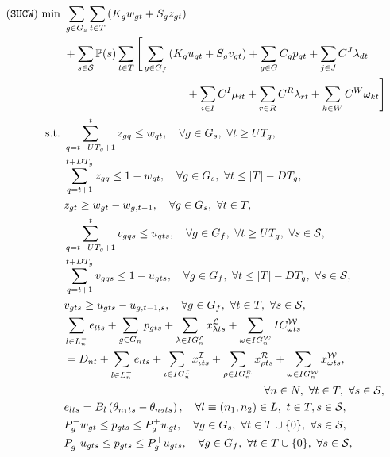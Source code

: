 \begin{subequations} \label{sucw:formulation}
	\begin{align}
	(\texttt{SUCW})\ \textrm{min}\ &\sum_{g\in G_s}\sum_{t \in T}\left(K_g w_{gt}+S_g z_{gt}\right) \nonumber \\	&+ \sum_{s\in\mathcal{S}}\PP(s)\sum_{t\in T} 
	\Bigg[	 \sum_{g\in G_f} \left(K_g u_{gt}+S_g v_{gt}\right) + \sum_{g\in G}C_g p_{gt} + \sum_{j\in J} C^{J}\lambda_{dt} \nonumber \\&\qquad\qquad\qquad\qquad\qquad\quad  + \sum_{i\in I} C^{I}\mu_{it} + \sum_{r\in R} C^{R}\lambda_{rt} + \sum_{k\in W} C^{W}\omega_{kt} \Bigg]
	\label{smkp:obj}\\
	\textrm{s.t.}\ &  \sum_{q=t-UT_g+1}^t z_{gq}\le w_{qt},\quad\forall g\in G_s,\ \forall t\ge UT_g,\\
	&\sum_{q=t+1}^{t+DT_g} z_{gq}\le 1-w_{gt},\quad\forall g\in G_s,\ \forall t\le |T|-DT_g,\\
	&z_{gt}\ge w_{gt}-w_{g,t-1},\quad\forall g\in G_s,\ \forall t\in T,\\
	&  \sum_{q=t-UT_g+1}^t v_{gqs}\le u_{qts},\quad\forall g\in G_f,\ \forall t\ge UT_g,\ \forall s\in\mathcal{S},\\
	&\sum_{q=t+1}^{t+DT_g} v_{gqs}\le 1-u_{gts},\quad\forall g\in G_f,\ \forall t\le |T|-DT_g,\ \forall s\in\mathcal{S},\\
	&v_{gts}\ge u_{gts}-u_{g,t-1,s},\quad\forall g\in G_f,\ \forall t\in T,\ \forall s\in\mathcal{S},\\
	&\sum_{l\in L_n^-}e_{lts}+\sum_{g\in G_n} p_{gts}+\sum_{\lambda\in IG_n^\mathcal{L}}x_{\lambda ts}^\mathcal{L} +\sum_{\omega\in IG_n^\mathcal{W}} IC_{\omega ts}^\mathcal{W} \nonumber \\ 
	&= D_{nt}+\sum_{l\in L_n^+}e_{lts}+\sum_{\iota\in IG_n^\mathcal{I}}x_{\iota ts}^\mathcal{I} + \sum_{\rho\in IG_n^\mathcal{R}} x_{\rho ts}^\mathcal{R} +\sum_{\omega\in IG_n^\mathcal{W}} x_{\omega ts}^\mathcal{W}, \nonumber \\
	&\qquad\qquad\qquad\qquad\qquad\qquad\qquad\qquad\qquad\forall n\in N,\ \forall t\in T,\ \forall s\in\mathcal{S},\\
	&e_{lts}=B_l\left(  \theta_{n_1 ts}-\theta_{n_2 ts}  \right),\quad\forall l\equiv (n_1, n_2)\in L,\ t\in T, s\in\mathcal{S},\\
	&P_g^- w_{gt} \le p_{gts} \le P_g^+ w_{gt},\quad\forall g\in G_s,\ \forall t\in T\cup\{0\},\ \forall s\in\mathcal{S},\\
	&P_g^- u_{gts} \le p_{gts} \le P_g^+ u_{gts},\quad\forall g\in G_f,\ \forall t\in T\cup\{0\},\ \forall s\in\mathcal{S},\\

\end{align}
\end{subequations}
